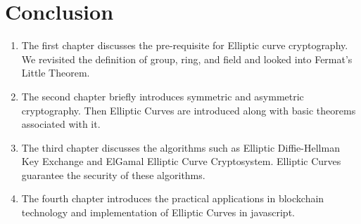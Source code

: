 \documentclass[a4paper,12pt]{report}
\begin{document}
\chapter{Conclusion}
\begin{enumerate}
\item The first chapter discusses the pre-requisite for Elliptic curve cryptography. We revisited the definition of group, ring, and field and looked into Fermat’s Little Theorem.
\item The second chapter briefly introduces symmetric and asymmetric cryptography. Then Elliptic Curves are introduced along with basic theorems associated with it.
\item The third chapter discusses the algorithms such as Elliptic Diffie-Hellman Key Exchange and ElGamal Elliptic Curve Cryptosystem. Elliptic Curves guarantee the security of these algorithms.
\item The fourth chapter introduces the practical applications in blockchain technology and implementation of Elliptic Curves in javascript.
\end{enumerate}


\end{document}
